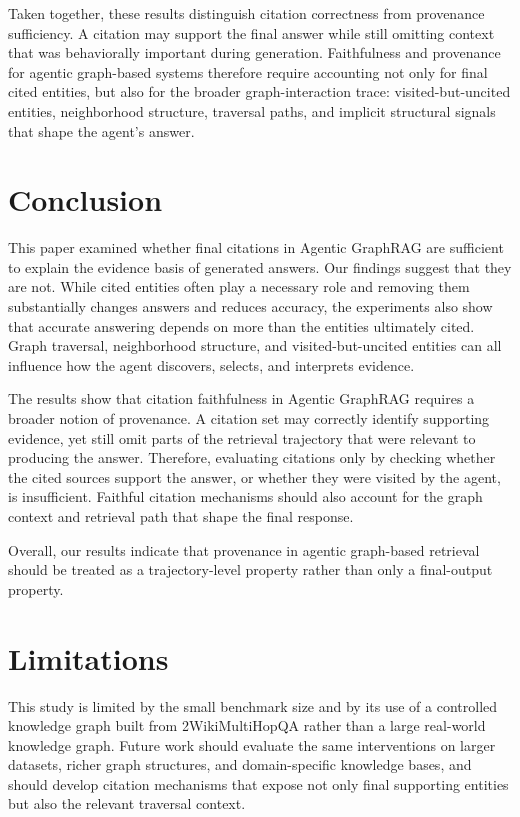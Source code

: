 \documentclass[
]{ceurart}
\begin{document}
Taken together, these results distinguish citation correctness from provenance sufficiency. A citation may support the final answer while still omitting context that was behaviorally important during generation. Faithfulness and  provenance for agentic graph-based systems therefore require accounting not only for final cited entities, but also for the broader graph-interaction trace: visited-but-uncited entities, neighborhood structure, traversal paths, and implicit structural signals that shape the agent's answer.

\section{Conclusion}

This paper examined whether final citations in Agentic GraphRAG are sufficient to explain the evidence basis of generated answers. Our findings suggest that they are not. While cited entities often play a necessary role and removing them substantially changes answers and reduces accuracy, the experiments also show that accurate answering depends on more than the entities ultimately cited. Graph traversal, neighborhood structure, and visited-but-uncited entities can all influence how the agent discovers, selects, and interprets evidence.

The results show that citation faithfulness in Agentic GraphRAG requires a broader notion of provenance. A citation set may correctly identify supporting evidence, yet still omit parts of the retrieval trajectory that were relevant to producing the answer. Therefore, evaluating citations only by checking whether the cited sources support the answer, or whether they were visited by the agent, is insufficient. Faithful citation mechanisms should also account for the graph context and retrieval path that shape the final response.

Overall, our results indicate that provenance in agentic graph-based retrieval should be treated as a trajectory-level property rather than only a final-output property. 

\section{Limitations}
This study is limited by the small benchmark size and by its use of a controlled knowledge graph built from 2WikiMultiHopQA rather than a large real-world knowledge graph. Future work should evaluate the same interventions on larger datasets, richer graph structures, and domain-specific knowledge bases, and should develop citation mechanisms that expose not only final supporting entities but also the relevant traversal context.
\end{document}
